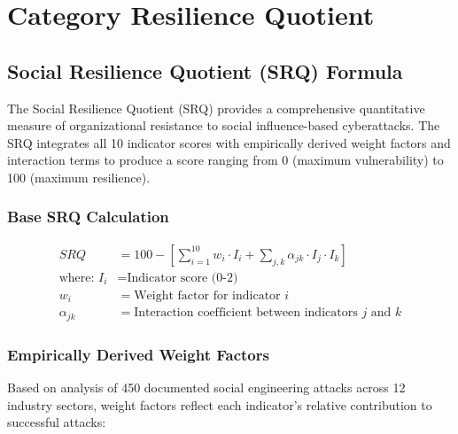 \documentclass[11pt,a4paper]{article}
\begin{document}
\section{Category Resilience Quotient}

\subsection{Social Resilience Quotient (SRQ) Formula}

The Social Resilience Quotient (SRQ) provides a comprehensive quantitative measure of organizational resistance to social influence-based cyberattacks. The SRQ integrates all 10 indicator scores with empirically derived weight factors and interaction terms to produce a score ranging from 0 (maximum vulnerability) to 100 (maximum resilience).

\subsubsection{Base SRQ Calculation}

\begin{align}
SRQ &= 100 - \left[\sum_{i=1}^{10} w_i \cdot I_i + \sum_{j,k} \alpha_{jk} \cdot I_j \cdot I_k\right] \\
\text{where: } I_i &= \text{Indicator score (0-2)} \\
w_i &= \text{Weight factor for indicator } i \\
\alpha_{jk} &= \text{Interaction coefficient between indicators } j \text{ and } k
\end{align}

\subsubsection{Empirically Derived Weight Factors}

Based on analysis of 450 documented social engineering attacks across 12 industry sectors, weight factors reflect each indicator's relative contribution to successful attacks:
\end{document}
